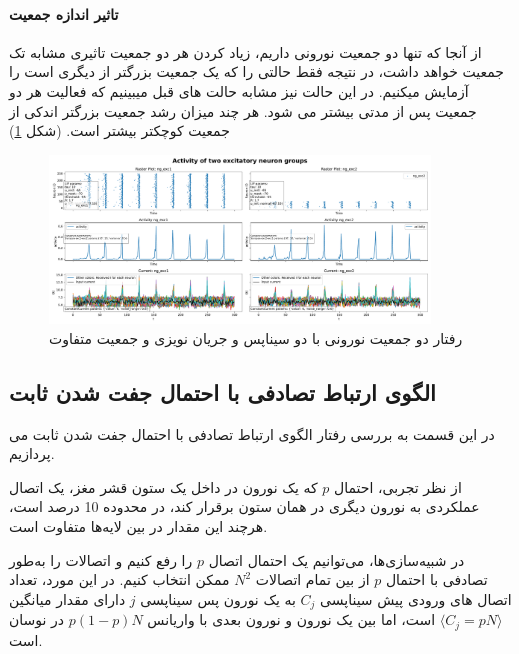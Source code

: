             \paragraph*{تاثیر اندازه جمعیت}
            از آنجا که تنها دو جمعیت نورونی داریم، زیاد کردن هر دو جمعیت تاثیری مشابه تک جمعیت خواهد داشت، در نتیجه فقط حالتی را که یک جمعیت بزرگتر از دیگری است را آزمایش میکنیم. در این حالت نیز مشابه حالت های قبل میبینیم که فعالیت هر دو جمعیت پس از مدتی بیشتر می شود. هر چند میزان رشد جمعیت بزرگتر اندکی از جمعیت کوچکتر بیشتر است.
            (شکل \ref{fig:part2-two-ng-full-synapse-diff-size-noise-curr})
            \begin{figure}[!ht]
                \centering
                \includegraphics[width=0.9\textwidth]{plots/part2-two-ng-full-synapse-diff-size-noise-curr.pdf} 
                \caption{رفتار دو جمعیت نورونی با دو سیناپس و جریان نویزی و جمعیت متفاوت}
                \label{fig:part2-two-ng-full-synapse-diff-size-noise-curr}
            \end{figure}


    \subsection{الگوی ارتباط تصادفی با احتمال جفت شدن ثابت}
        در این قسمت به بررسی رفتار الگوی ارتباط تصادفی با احتمال جفت شدن ثابت می پردازیم. 

        از نظر تجربی، احتمال 
        $p$
        که یک نورون در داخل یک ستون قشر مغز، یک اتصال عملکردی به نورون دیگری در همان ستون برقرار کند، در محدوده 10 درصد است، هرچند این مقدار در بین لایه‌ها متفاوت است.

        در شبیه‌سازی‌ها، می‌توانیم یک احتمال اتصال 
        $p$ 
        را رفع کنیم و اتصالات را به‌طور تصادفی با احتمال 
        $p$ 
        از بین تمام اتصالات 
        $N^2$ 
        ممکن انتخاب کنیم. در این مورد، تعداد اتصال های ورودی پیش سیناپسی 
        $C_j$
        به یک نورون پس سیناپسی 
        $j$
        دارای مقدار میانگین 
        $\langle C_j = pN\rangle$
        است، اما بین یک نورون و نورون بعدی با واریانس 
        $p(1-p)N$ 
        در نوسان است.

